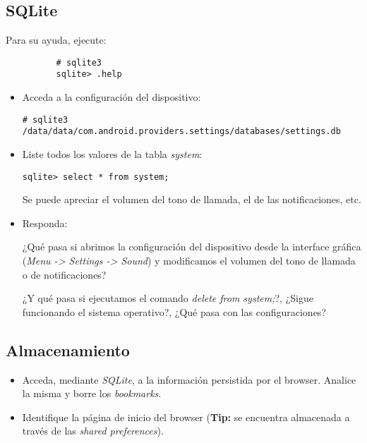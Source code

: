 \subsection{SQLite}
Para su ayuda, ejecute:
\begin{lstlisting}
          # sqlite3
          sqlite> .help
\end{lstlisting}

\begin{itemize}
    \item Acceda a la configuración del dispositivo:
    \begin{lstlisting}
# sqlite3 /data/data/com.android.providers.settings/databases/settings.db
    \end{lstlisting}

    \item Liste todos los valores de la tabla \emph{system}:
    \begin{lstlisting}
sqlite> select * from system;
    \end{lstlisting}
    Se puede apreciar el volumen del tono de llamada, el de las notificaciones, etc.    
    
    \item Responda:
    \begin{questions}
  \question ¿Qué pasa si abrimos la configuración del dispositivo desde la interface gráfica (\emph{Menu -> Settings -> Sound}) y modificamos el volumen del tono de llamada o de notificaciones?
  
  \question ¿Y qué pasa si ejecutamos el comando \textit{delete from system;}?, ¿Sigue funcionando el sistema operativo?, ¿Qué pasa con las configuraciones?
    \end{questions}
\end{itemize}

\subsection{Almacenamiento}
\begin{itemize}
    \item Acceda, mediante \textit{SQLite}, a la información persistida por el browser. Analice la misma y borre los \textit{bookmarks}.

    \item Identifique la página de inicio del browser (\textbf{Tip:} se encuentra almacenada a través de las \textit{shared preferences}).    
\end{itemize}

